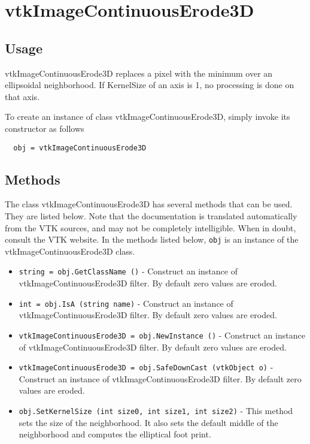 \section{vtkImageContinuousErode3D}

\subsection{Usage}

 vtkImageContinuousErode3D replaces a pixel with the minimum over
 an ellipsoidal neighborhood.  If KernelSize of an axis is 1, no processing
 is done on that axis.

To create an instance of class vtkImageContinuousErode3D, simply
invoke its constructor as follows
\begin{verbatim}
  obj = vtkImageContinuousErode3D
\end{verbatim}
\subsection{Methods}

The class vtkImageContinuousErode3D has several methods that can be used.
  They are listed below.
Note that the documentation is translated automatically from the VTK sources,
and may not be completely intelligible.  When in doubt, consult the VTK website.
In the methods listed below, \verb|obj| is an instance of the vtkImageContinuousErode3D class.
\begin{itemize}
\item  \verb|string = obj.GetClassName ()| -  Construct an instance of vtkImageContinuousErode3D filter.
 By default zero values are eroded.

\item  \verb|int = obj.IsA (string name)| -  Construct an instance of vtkImageContinuousErode3D filter.
 By default zero values are eroded.

\item  \verb|vtkImageContinuousErode3D = obj.NewInstance ()| -  Construct an instance of vtkImageContinuousErode3D filter.
 By default zero values are eroded.

\item  \verb|vtkImageContinuousErode3D = obj.SafeDownCast (vtkObject o)| -  Construct an instance of vtkImageContinuousErode3D filter.
 By default zero values are eroded.

\item  \verb|obj.SetKernelSize (int size0, int size1, int size2)| -  This method sets the size of the neighborhood.  It also sets the 
 default middle of the neighborhood and computes the elliptical foot print.

\end{itemize}
